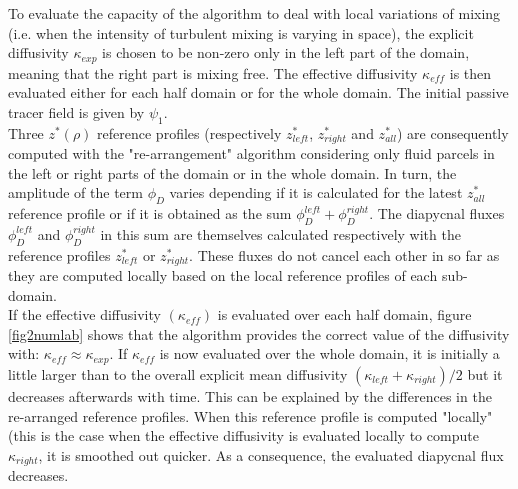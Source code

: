 To evaluate the capacity of the algorithm to deal with local variations of mixing (i.e. when the intensity of turbulent mixing is varying in space), the explicit diffusivity $\kappa_{exp}$ is chosen to be non-zero only in the left part of the domain, meaning that the right part is mixing free. The effective diffusivity $\kappa_{eff}$ is then evaluated either for each half domain or for the whole domain. The initial passive tracer field is given by $\psi_1$.\\
Three $z^*(\rho)$ reference profiles (respectively $z^*_{left}$, $z^*_{right}$ and $z^*_{all}$) are consequently computed with the "re-arrangement" algorithm considering only fluid parcels in the left or right parts of the domain or in the whole domain.
In turn, the amplitude of the term $\phi_D$ varies depending if it is calculated for the latest $z^*_{all}$ reference profile or if it is obtained as the sum  $\phi_D^{left}+\phi_D^{right}$. The diapycnal fluxes $\phi_D^{left}$ and $\phi_D^{right}$ in this sum are themselves calculated respectively with the reference profiles $z^*_{left}$ or $z^*_{right}$. These fluxes do not cancel each other in so far as they are computed locally based on the local reference profiles of each sub-domain.\\
If the effective diffusivity $(\kappa_{eff})$ is evaluated over each half domain, figure \ref{fig2numlab} shows that the algorithm provides the correct value of the diffusivity with: $\kappa_{eff}\approx\kappa_{exp}$. If $\kappa_{eff}$ is now evaluated over the whole domain, it is initially a little larger than to the overall explicit mean diffusivity $(\kappa_{left}+\kappa_{right})/2$ but it decreases afterwards with time. This can be explained by the differences in the re-arranged reference profiles. When this reference profile is computed "locally" (this is the case when the effective diffusivity is evaluated locally to compute $\kappa_{right}$, it is smoothed out quicker. As a consequence, the evaluated diapycnal flux decreases.
